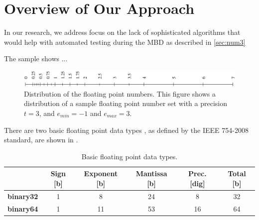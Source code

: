 \chapter{Overview of Our Approach}
\label{chap.ourapproach}

In our research, we address focus on the lack of sophisticated algorithms that would help with automated testing during the MBD as described in \ref{sec:num3}





The sample  shows ...

\begin{figure}[htb]
\begin{center}
\includegraphics[width=.95\textwidth]{pic/float.pdf}
\end{center}
\caption{Distribution of the floating point numbers. This figure shows a distribution of a sample floating point number set with a precision $t=3$, and $e_{min}=-1$ and $e_{max}=3$.}
\label{fig.float}
\end{figure}


There are two basic floating point  data types , as defined by the IEEE 754-2008 \cite{ieee754} standard, are shown in .

\begin{table}[htb]
\begin{center}
\begin{tabular}{|r|c|c|c||c||c|}
\cline{2-6}

\multicolumn{1}{r|}{} & {\vrule height 13pt depth 6pt width 0pt\bf Sign} [b] & {\bf Exponent} [b] & {\bf Mantissa} [b] & {\bf Prec.} [dig] & {\bf Total} [b]\\ \cline{2-6}  \hline

\vrule height 10pt depth 20pt width 0pt
{\bf binary32}   			& 1    & 8        	& 24      & 8  	& 32\\ \hline

\vrule height 20pt depth 0pt width 1pt
{\bf binary64}   			& 1    & 11       	& 53      & 16	& 64\\ \hline
\end{tabular}
\end{center}
\caption{Basic floating point data types.}
\label{tab.floatingpointdatatypes}
\end{table}
